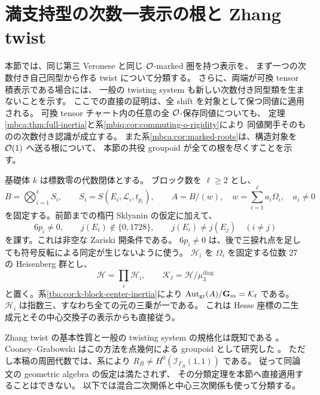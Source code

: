 \section{満支持型の次数一表示の根と Zhang twist}
\label{mbr:sec:roots}

本節では、同じ第三 Veronese と同じ $\mathcal O$-marked 圏を持つ表示を、
まず一つの次数付き自己同型から作る twist について分類する。
さらに、両端が可換 tensor 積表示である場合には、
一般の twisting system も新しい次数付き同型類を生まないことを示す。
ここでの直接の証明は、全 shift を対象として保つ同値に適用される。
可換 tensor チャート内の任意の全 $\mathcal O$-保存同値についても、
定理\ref{mbca:thm:full-inertia}と系\ref{mbiq:cor:commuting-o-rigidity}により
同値関手そのものの次数付き認識が成立する。
また系\ref{mbca:cor:marked-roots}は、構造対象を $\mathcal O(1)$ へ送る根について、
本節の共役 groupoid が全ての根を尽くすことを示す。

基礎体 $k$ は標数零の代数閉体とする。
ブロック数を $\ell\ge2$ とし、
\begin{equation}\label{mbr:eq:setup}
 B=\bigotimes_{i=1}^{\ell}S_i,\qquad
 S_i=S(E_i,\mathcal L_i,t_{p_i}),\qquad
 A=B/(w),\quad w=\sum_{i=1}^{\ell}a_i\Omega_i,\quad a_i\ne0
\end{equation}
を固定する。前節までの楕円 Sklyanin の仮定に加えて、
\begin{equation}\label{mbr:eq:good-open}
 6p_i\ne0,\qquad
 j(E_i)\notin\{0,1728\},\qquad
 j(E_i)\ne j(E_j)\quad(i\ne j)
\end{equation}
を課す。これは非空な Zariski 開条件である。
$6p_i\ne0$ は、後で三捩れ点を足しても符号反転による同定が生じないように使う。
$\mathcal H_i$ を $\Omega_i$ を固定する位数 $27$ の Heisenberg 群とし、
\begin{equation}\label{mbr:eq:finite-group}
 \mathcal H=\prod_i\mathcal H_i,\qquad
 \mathcal K_\ell=\mathcal H/\mu_3^{\mathrm{diag}}
\end{equation}
と置く。系\ref{tba:cor:k-block-center-inertia}により
$\operatorname{Aut}_{\mathrm{gr}}(A)/\mathbf G_m=\mathcal K_\ell$ である。
$\mathcal H_i$ は指数三、すなわち全ての元の三乗が一である。
これは Hesse 座標の二生成元とその中心交換子の表示からも直接従う。

Zhang twist の基本性質と一般の twisting system の規格化は既知である
\cite[Proposition~2.4, Theorems~3.1 and~3.7]{TBPZhangTwist}。
Cooney--Grabowski はこの方法を点幾何による groupoid として研究した
\cite[Proposition~10, Definition~11 and Theorem~28]{MBRCooneyGrabowski}。
ただし本稿の周囲代数では、系により
$R_B\ne H^0(\mathcal I_{\Gamma_B}(1,1))$ である。
従って同論文の geometric algebra の仮定は満たされず、
その分類定理を本節へ直接適用することはできない。
以下では混合二次関係と中心三次関係も使って分類する。

